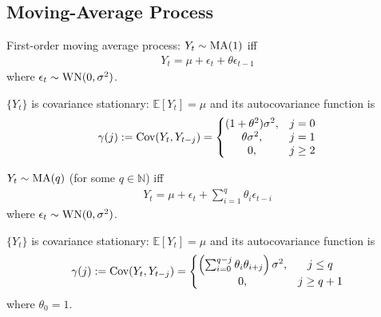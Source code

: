 \documentclass[11pt]{elegantbook}
\begin{document}
\subsection{Moving-Average Process}
\begin{definition}[MA(1)]
    First-order moving average process: $Y_t\sim \textnormal{MA}(1)$ iff
    \begin{equation}
        \begin{aligned}
            Y_t=\mu+\epsilon_t+\theta\epsilon_{t-1}
        \end{aligned}
        \nonumber
    \end{equation}
    where $\epsilon_t\sim \textnormal{WN}(0,\sigma^2)$.
\end{definition}
\begin{claim}[ACF of MA(1)]
    $\{Y_t\}$ is covariance stationary: $\mathbb{E}[Y_t]=\mu$ and its autocovariance function is
    \begin{equation}
        \begin{aligned}
            \gamma(j):=\textnormal{Cov}(Y_t,Y_{t-j})=\left\{\begin{matrix}
                (1+\theta^2)\sigma^2,&j=0\\
                \theta\sigma^2,&j=1\\
                0,&j\geq 2
            \end{matrix}\right.
        \end{aligned}
        \nonumber
    \end{equation}
\end{claim}
\begin{definition}[MA(p)]
    $Y_t\sim \textnormal{MA}(q)$ (for some $q\in \mathbb{N}$) iff
    \begin{equation}
        \begin{aligned}
            Y_t=\mu+\epsilon_t+\sum_{i=1}^{q}\theta_i\epsilon_{t-i}
        \end{aligned}
        \nonumber
    \end{equation}
    where $\epsilon_t\sim \textnormal{WN}(0,\sigma^2)$.
\end{definition}
\begin{claim}[ACF of MA(p)]
    $\{Y_t\}$ is covariance stationary: $\mathbb{E}[Y_t]=\mu$ and its autocovariance function is
    \begin{equation}
        \begin{aligned}
            \gamma(j):=\textnormal{Cov}(Y_t,Y_{t-j})=\left\{\begin{matrix}
                \left(\sum_{i=0}^{q-j}\theta_i\theta_{i+j}\right)\sigma^2,&j\leq q\\
                0,&j\geq q+1
            \end{matrix}\right.
        \end{aligned}
        \nonumber
    \end{equation}
    where $\theta_0=1$.
\end{claim}
\end{document}
